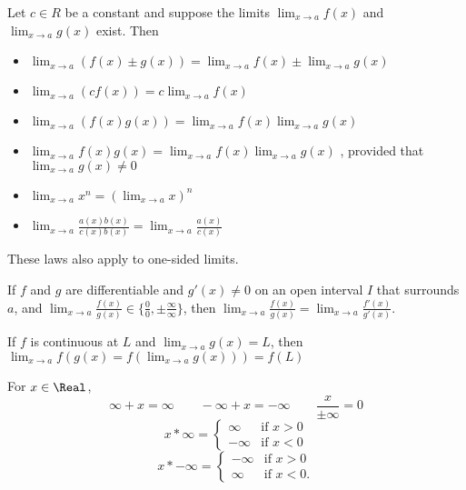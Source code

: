 \begin{theorem}
  Let $c \in R$ be a constant and suppose the limits $\lim_{x \to a} f (x)$ and $\lim_{x \to a} g (x)$ exist. Then
  \begin{itemize}
  \item $\displaystyle\lim_{x \to a}( f (x) \pm g(x)) = \lim_{x \to a} f (x) \pm \lim_{x \to a} g(x)$
  \item $\displaystyle\lim_{x \to a}(c f (x)) = c \lim_{x \to a} f (x)$
  \item $\displaystyle\lim_{x \to a}( f (x)g(x)) = \lim_{x \to a} f (x) \lim_{x \to a} g(x)$
  \item $\displaystyle\lim_{x \to a} f (x) g(x) = \lim_{x \to a} f (x) \lim_{x \to a} g(x)$ , provided that $\displaystyle\lim_{x \to a} g(x) \neq 0$
  \item $\displaystyle\lim_{x \to a} x^n = (\lim_{x \to a} x)^n$
  \item $\displaystyle\lim_{x \to a} \frac{a(x)b(x)}{c(x)b(x)} = \lim_{x \to a} \frac{a(x)}{c(x)}$
  \end{itemize}
  These laws also apply to one-sided limits.
\end{theorem}

\begin{theorem}
  If $f$ and $g$ are differentiable and $g'(x) \neq 0$ on an open interval $I$ that surrounds $a$, and $\displaystyle\lim_{x \to a}\frac{f(x)}{g(x)} \in \{\frac{0}{0}, \pm\frac{\infty}{\infty}\}$, then $\displaystyle\lim_{x \to a}\frac{f(x)}{g(x)} = \lim_{x \to a}\frac{f'(x)}{g'(x)}$.
\end{theorem}

\begin{theorem}
  If $f$ is continuous at $L$ and $\displaystyle\lim_{x \to a}g(x) = L$, then $\displaystyle\lim_{x \to a} f(g(x) = f(\lim_{x \to a} g(x))) = f(L)$
\end{theorem}

\begin{theorem}
  For $x \in \Real$,
  \[
    \infty + x = \infty \qquad
    -\infty + x = -\infty \qquad
    \frac{x}{\pm\infty} = 0 
  \]\[
    x * \infty = \begin{cases}
      \infty & \text{if } x > 0 \\
      -\infty & \text{if } x < 0
    \end{cases}
  \]\[
    x * -\infty = \begin{cases}
      -\infty & \text{if } x > 0 \\
      \infty & \text{if } x < 0.
    \end{cases}
  \]
\end{theorem}

